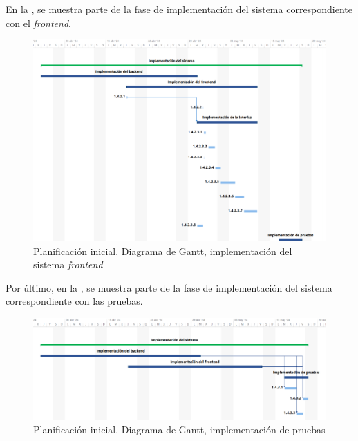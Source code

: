 En la , se muestra parte de la fase de implementación del sistema correspondiente con el \textit{frontend}.
\begin{figure}[H]
    \hypertarget{fig:5_PI-Gantt-Implementacion-2}{}
    \centering
    \includegraphics[width=1\linewidth]{figures/5-Gantt/5-Gantt-Implementacion-frontend.png}
    \caption{Planificación inicial. Diagrama de Gantt, implementación del sistema \textit{frontend}}
    \label{fig:5_PI-Gantt-Implementacion-2}
\end{figure}
Por último, en la , se muestra parte de la fase de implementación del sistema correspondiente con las pruebas.
\begin{figure}[H]
    \hypertarget{fig:5_PI-Gantt-Implementacion-3}{}
    \centering
    \includegraphics[width=1\linewidth]{figures/5-Gantt/5-Gantt-Implementacion-pruebas.png}
    \caption{Planificación inicial. Diagrama de Gantt, implementación de pruebas}
    \label{fig:5_PI-Gantt-Implementacion-3}
\end{figure}


